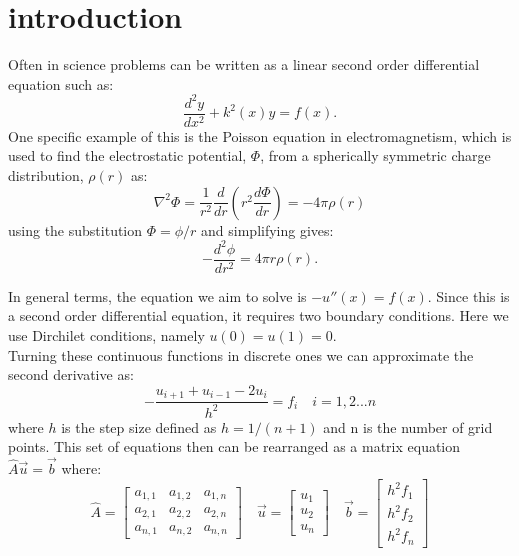 \documentclass[prc,amsmath,twocolumn,superscriptaddress]{revtex4}
\begin{document}
\section{introduction}
\label{intro}
Often in science problems can be written as a linear second order differential equation such as:
\begin{equation}
\frac{d^2y}{dx^2}+k^2(x)y=f(x).
\end{equation}
One specific example of this is the Poisson equation in electromagnetism, which is used to find the electrostatic potential, $\Phi$, from a spherically symmetric charge distribution, $\rho (r)$ as:
\begin{equation}
\nabla^2\Phi=\frac{1}{r^2}\frac{d}{dr}\left(r^2\frac{d\Phi}{dr}\right)=-4\pi \rho(r)
\end{equation}
using the substitution $\Phi=\phi/r$ and simplifying gives:
\begin{equation}
-\frac{d^2\phi}{dr^2}=4\pi r \rho(r).
\end{equation}

In general terms, the equation we aim to solve is $-u''(x)=f(x)$. Since this is a second order differential equation, it requires two boundary conditions. Here we use Dirchilet conditions, namely $u(0)=u(1)=0$. \\

Turning these continuous functions in discrete ones we can approximate the second derivative as:
\begin{equation}
-\frac{u_{i+1}+u_{i-1}-2u_i}{h^2}=f_i \quad i=1,2...n
\label{deriv}
\end{equation}
where $h$ is the step size defined as $h=1/(n+1)$ and n is the number of grid points. This set of equations then can be rearranged as a matrix equation $\hat{A}\vec{u}=\vec{b}$ where:
\begin{equation}
\hat{A}=\begin{bmatrix} a_{1,1} & a_{1,2} &a_{1,n} \\ a_{2,1}  & a_{2,2} &a_{2,n} \\ a_{n,1}  & a_{n,2}  &a_{n,n} \end{bmatrix}
\quad \vec{u}=\begin{bmatrix} u_1  \\ u_2\\ u_n \end{bmatrix} 
\quad \vec{b}=\begin{bmatrix} h^2f_1  \\ h^2f_2\\ h^2f_n \end{bmatrix}
\end{equation}
\end{document}
